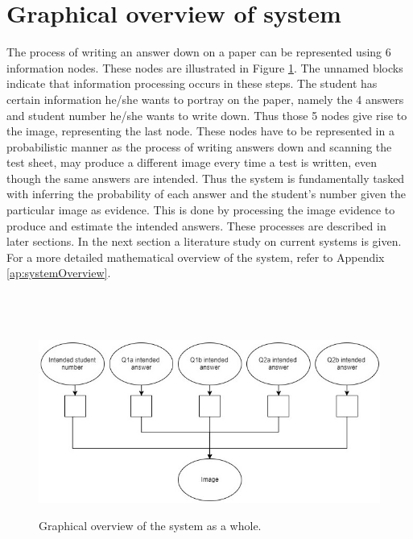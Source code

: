 \section{Graphical overview of system}
The process of writing an answer down on a paper can be represented using 6 information nodes. These nodes are illustrated in Figure \ref{fig:systemOverviewIntro}. The unnamed blocks indicate that information processing occurs in these steps. The student has certain information he/she wants to portray on the paper, namely the 4 answers and student number he/she wants to write down. Thus those 5 nodes give rise to the image, representing the last node. These nodes have to be represented in a probabilistic manner as the process of writing answers down and scanning the test sheet, may produce a different image every time a test is written, even though the same answers are intended. Thus the system is fundamentally tasked with inferring the probability of each answer and the student's number given the particular image as evidence. This is done by processing the image evidence to produce and estimate the intended answers. These processes are described in later sections. In the next section a literature study on current systems is given. For a more detailed mathematical overview of the system, refer to Appendix \ref{ap:systemOverview}.
\\
\\
\\
\\
\begin{figure}[H]
  \centering
  \includegraphics[width=13cm]{systemOverview}\\
  \caption{Graphical overview of the system as a whole.}
  \label{fig:systemOverviewIntro}
\end{figure}